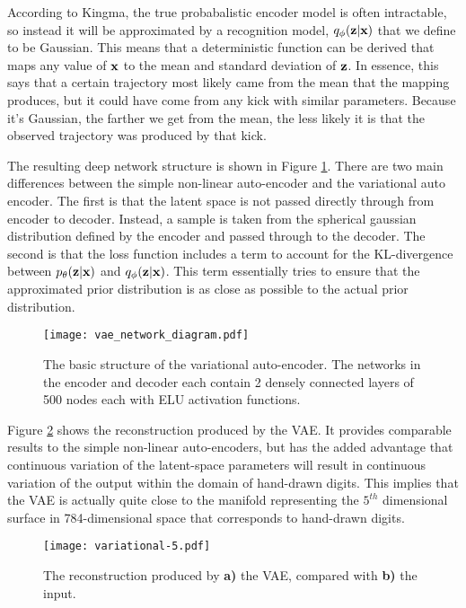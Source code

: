 \documentclass{article}
\begin{document}
According to Kingma, the true probabalistic encoder model is often intractable, so instead it will be approximated by a recognition model, $q_\phi(\textbf z | \textbf x)$ that we define to be Gaussian\cite{kingma}. This means that a deterministic function can be derived that maps any value of $\textbf x$ to the mean and standard deviation of $\textbf z$. In essence, this says that a certain trajectory most likely came from the mean that the mapping produces, but it could have come from any kick with similar parameters. Because it's Gaussian, the farther we get from the mean, the less likely it is that the observed trajectory was produced by that kick. 

The resulting deep network structure is shown in Figure \ref{fig:vae_network_diagram}. There are two main differences between the simple non-linear auto-encoder and the variational auto encoder. The first is that the latent space is not passed directly through from encoder to decoder. Instead, a sample is taken from the spherical gaussian distribution defined by the encoder and passed through to the decoder. The second is that the loss function includes a term to account for the KL-divergence between $p_\theta(\textbf z|\textbf x)$ and $q_\phi(\textbf z|\textbf x)$. This term essentially tries to ensure that the approximated prior distribution is as close as possible to the actual prior distribution. 

\begin{figure}[h]
\begin{center}
\texttt{[image: vae\_network\_diagram.pdf]} 
\caption{The basic structure of the variational auto-encoder. The networks in the encoder and decoder each contain 2 densely connected layers of 500 nodes each with ELU activation functions.}
\label{fig:vae_network_diagram}
\end{center}
\end{figure}

Figure \ref{fig:variational_reconstruction} shows the reconstruction produced by the VAE. It provides comparable results to the simple non-linear auto-encoders, but has the added advantage that continuous variation of the latent-space parameters will result in continuous variation of the output within the domain of hand-drawn digits. This implies that the VAE is actually quite close to the manifold representing the $5^{th}$ dimensional surface in 784-dimensional space that corresponds to hand-drawn digits.

\begin{figure}[h]
\begin{center}
\texttt{[image: variational-5.pdf]} 
\caption{The reconstruction produced by \textbf{a)} the VAE, compared with \textbf{b)} the input.}
\label{fig:variational_reconstruction}
\end{center}
\end{figure}
\end{document}
